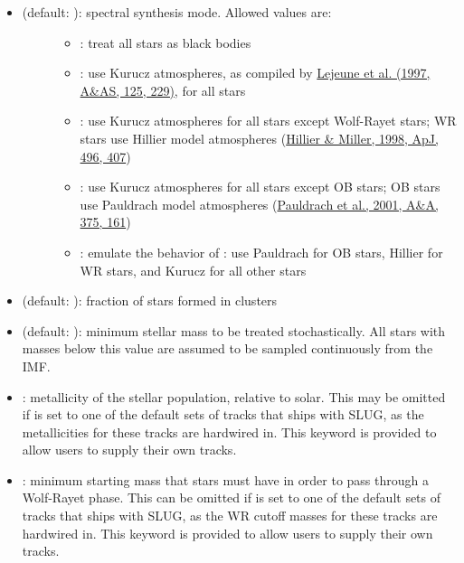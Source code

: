 \documentclass[letterpaper,10pt,english]{sphinxmanual}
\begin{document}
\begin{itemize}
\item {} \begin{description}
\item[{ (default: ): spectral synthesis mode. Allowed values are:}] \leavevmode\begin{itemize}
\item {} 
: treat all stars as black bodies

\item {} 
: use Kurucz atmospheres, as compiled by \href{http://adsabs.harvard.edu/abs/1997A\%26AS..125..229L}{Lejeune et al. (1997, A\&AS, 125, 229)}, for all stars

\item {} 
: use Kurucz atmospheres for all stars except Wolf-Rayet stars; WR stars use Hillier model atmospheres (\href{http://adsabs.harvard.edu/abs/1998ApJ...496..407H}{Hillier \& Miller, 1998, ApJ, 496, 407})

\item {} 
: use Kurucz atmospheres for all stars except OB stars; OB stars use Pauldrach model atmospheres (\href{http://adsabs.harvard.edu/abs/2001A\%26A...375..161P}{Pauldrach et al., 2001, A\&A, 375, 161})

\item {} 
: emulate the behavior of : use Pauldrach for OB stars, Hillier for WR stars, and Kurucz for all other stars

\end{itemize}

\end{description}

\item {} 
 (default: ): fraction of stars formed in clusters

\item {} 
 (default: ): minimum stellar mass to be treated stochastically. All stars with masses below this value are assumed to be sampled continuously from the IMF.

\item {} 
: metallicity of the stellar population, relative to solar. This may be omitted if  is set to one of the default sets of tracks that ships with SLUG, as the metallicities for these tracks are hardwired in. This keyword is provided to allow users to supply their own tracks.

\item {} 
: minimum starting mass that stars must have in order to pass through a Wolf-Rayet phase. This can be omitted if  is set to one of the default sets of tracks that ships with SLUG, as the WR cutoff masses for these tracks are hardwired in. This keyword is provided to allow users to supply their own tracks.

\end{itemize}
\end{document}
